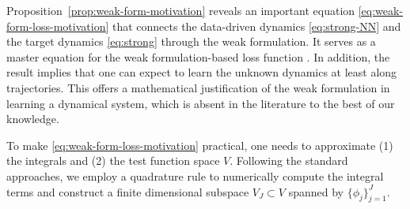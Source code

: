 \documentclass[final]{siamltex}
\begin{document}
Proposition~\ref{prop:weak-form-motivation} reveals an important equation \eqref{eq:weak-form-loss-motivation} that connects the data-driven dynamics \eqref{eq:strong-NN} and the target dynamics \eqref{eq:strong} through the weak formulation. It serves as a master equation for the weak formulation-based loss function \cite{tran2024weak,messenger2021weak}.
In addition, the result implies that one can expect to learn the unknown dynamics at least along trajectories. 
This offers a mathematical justification of the weak formulation in learning a dynamical system, which is absent in the literature to the best of our knowledge.


To make \eqref{eq:weak-form-loss-motivation} practical, one needs to approximate (1) the integrals and (2) the test function space $V$.
Following the standard approaches, we employ a quadrature rule to numerically compute the integral terms and construct a finite dimensional subspace $V_J \subset V$ spanned by $\{\phi_j\}_{j=1}^J$.
\end{document}
